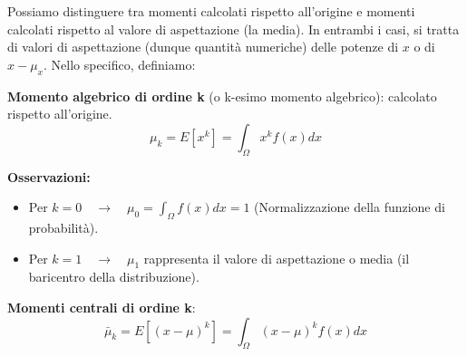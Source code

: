 \documentclass[openany,a4paper,12pt]{book}
\theoremstyle{remark}
\begin{document}
Possiamo distinguere tra momenti calcolati rispetto all’origine e momenti calcolati rispetto al valore di aspettazione (la media). In entrambi i casi, si tratta di valori di aspettazione (dunque quantità numeriche) delle potenze di $x$ o di $x-\mu_x$. 
Nello specifico, definiamo:
   
\begin{definizione} \textbf{Momento algebrico di ordine k} (o k-esimo momento algebrico): calcolato rispetto all'origine.
\[
\mu_k=E[x^k]=\int_\Omega x^k f(x) dx
\]
\end{definizione}

\textbf{Osservazioni:}
\begin{itemize}
    \item Per $k=0 \quad \to \quad  \mu_0 =\int_\Omega f(x) dx =1$ (Normalizzazione della funzione di probabilità).
    \item Per $k=1 \quad \to \quad \mu_1$ rappresenta il valore di aspettazione o media (il baricentro della distribuzione).
\end{itemize}
\begin{definizione}
\textbf{Momenti centrali di ordine k}:
\[
\bar{\mu}_k=E[(x-\mu)^k]=\int_\Omega (x-\mu)^k f(x) dx
\]
\end{definizione}
\end{document}

